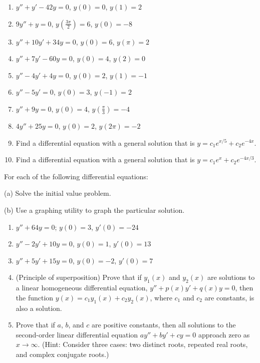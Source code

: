 \documentclass{exercises}
\begin{document}
\begin{enumerate}[resume]
\item $y''+y'-42y=0$, $y(0)=0$, $y(1)=2$
\item $9y''+y=0$, $y(\frac{3\pi}{2})=6$, $y(0)=-8$
\item $y''+10y'+34y=0$, $y(0)=6$, $y(\pi)=2$
\item $y''+7y'-60y=0$, $y(0)=4$, $y(2)=0$
\item $y''-4y'+4y=0$, $y(0)=2$, $y(1)=-1$
\item $y''-5y'=0$, $y(0)=3$, $y(-1)=2$
\item $y''+9y=0$, $y(0)=4$, $y(\frac{\pi}{3})=-4$
\item $4y''+25y=0$, $y(0)=2$, $y(2\pi)=-2$
\item Find a differential equation with a general solution that is $y=c_{1}e^{x/5}+c_{2}e^{-4x}$.
\item Find a differential equation with a general solution that is $y=c_{1}e^{x}+c_{2}e^{-4x/3}$.
\end{enumerate}

For each of the following differential equations:


(a) Solve the initial value problem.


(b) \techrequired Use a graphing utility to graph the particular solution.

\begin{enumerate}[resume]
\item $y''+64y=0$; $y(0)=3$, $y'(0)=-24$
\item $y''-2y'+10y=0$, $y(0)=1$, $y'(0)=13$
\item $y''+5y'+15y=0$, $y(0)=-2$, $y'(0)=7$
\item (Principle of superposition) Prove that if $y_{1}(x)$ and $y_{2}(x)$ are solutions to a linear homogeneous differential equation, $y''+p(x)y'+q(x)y=0$, then the function $y(x)=c_{1}y_{1}(x)+c_{2}y_{2}(x)$, where $c_{1}$ and $c_{2}$ are constants, is also a solution.
\item Prove that if $a$, $b$, and $c$ are positive constants, then all solutions to the second-order linear differential equation $ay''+by'+cy=0$ approach zero as $x\to \infty$. (Hint: Consider three cases: two distinct roots, repeated real roots, and complex conjugate roots.)
\end{enumerate}
\end{document}
